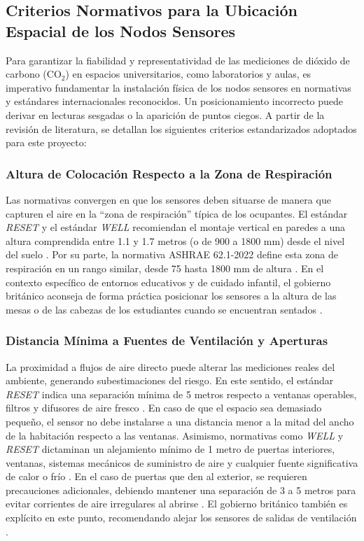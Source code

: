 \subsection{Criterios Normativos para la Ubicación Espacial de los Nodos Sensores}

Para garantizar la fiabilidad y representatividad de las mediciones de dióxido de carbono (CO$_2$) en espacios universitarios, como laboratorios y aulas, es imperativo fundamentar la instalación física de los nodos sensores en normativas y estándares internacionales reconocidos. Un posicionamiento incorrecto puede derivar en lecturas sesgadas o la aparición de puntos ciegos. A partir de la revisión de literatura, se detallan los siguientes criterios estandarizados adoptados para este proyecto:

\subsubsection{Altura de Colocación Respecto a la Zona de Respiración}
Las normativas convergen en que los sensores deben situarse de manera que capturen el aire en la ``zona de respiración'' típica de los ocupantes. El estándar \textit{RESET} y el estándar \textit{WELL} recomiendan el montaje vertical en paredes a una altura comprendida entre 1.1 y 1.7 metros (o de 900 a 1800 mm) desde el nivel del suelo \cite{reset_standard_v2, well_performance_guidebook}. Por su parte, la normativa ASHRAE 62.1-2022 define esta zona de respiración en un rango similar, desde 75 hasta 1800 mm de altura \cite{ashrae_62_1_2022}. En el contexto específico de entornos educativos y de cuidado infantil, el gobierno británico aconseja de forma práctica posicionar los sensores a la altura de las mesas o de las cabezas de los estudiantes cuando se encuentran sentados \cite{gov_uk_ventilation_education}.

\subsubsection{Distancia Mínima a Fuentes de Ventilación y Aperturas}
La proximidad a flujos de aire directo puede alterar las mediciones reales del ambiente, generando subestimaciones del riesgo. En este sentido, el estándar \textit{RESET} indica una separación mínima de 5 metros respecto a ventanas operables, filtros y difusores de aire fresco \cite{reset_standard_v2}. En caso de que el espacio sea demasiado pequeño, el sensor no debe instalarse a una distancia menor a la mitad del ancho de la habitación respecto a las ventanas. Asimismo, normativas como \textit{WELL} y \textit{RESET} dictaminan un alejamiento mínimo de 1 metro de puertas interiores, ventanas, sistemas mecánicos de suministro de aire y cualquier fuente significativa de calor o frío \cite{well_performance_guidebook, reset_standard_v2}. En el caso de puertas que den al exterior, se requieren precauciones adicionales, debiendo mantener una separación de 3 a 5 metros para evitar corrientes de aire irregulares al abrirse \cite{well_performance_guidebook}. El gobierno británico también es explícito en este punto, recomendando alejar los sensores de salidas de ventilación \cite{gov_uk_ventilation_education}.

